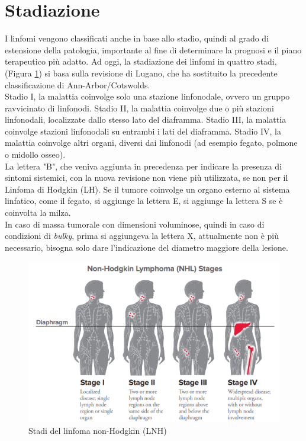 \section{Stadiazione}
I linfomi vengono classificati anche in base allo stadio, quindi al grado di estensione della patologia, 
importante al fine di determinare la prognosi e il piano terapeutico più adatto. 
Ad oggi, la stadiazione dei linfomi in quattro stadi, (Figura \ref{fig:FIGURE_2.14}) si basa sulla revisione di 
Lugano, che ha sostituito la precedente classificazione di Ann-Arbor/Cotswolds\cite{AIOM}.\\
Stadio I, la malattia coinvolge solo una stazione linfonodale, ovvero un gruppo ravvicinato di linfonodi. 
Stadio II, la malattia coinvolge due o più stazioni linfonodali, localizzate dallo stesso lato del diaframma. 
Stadio III, la malattia coinvolge stazioni linfonodali su entrambi i lati del diaframma. 
Stadio IV, la malattia coinvolge altri organi, diversi dai linfonodi (ad esempio fegato, polmone o midollo osseo)\cite{LLS}.\\
La lettera "B", che veniva aggiunta in precedenza per indicare la presenza di sintomi sistemici, 
con la nuova revisione non viene più utilizzata, se non per il Linfoma di Hodgkin (LH)\cite{AIOM}.
Se il tumore coinvolge un organo esterno al sistema linfatico, come il fegato, si aggiunge la lettera E, 
si aggiunge la lettera S se è coinvolta la milza\cite{ISTGENT}.\\
In caso di massa tumorale con dimensioni voluminose, quindi in caso di condizioni di \emph{bulky}, 
prima si aggiungeva la lettera X, attualmente non è più necessario, 
bisogna solo dare l’indicazione del diametro maggiore della lesione\cite{AIOM}.

\begin{figure}[H]
    \begin{center}
    \includegraphics[width=0.7\columnwidth]{img/nhlstages.png}
    \vspace{-3mm}
    \end{center}
    \caption{Stadi del linfoma non-Hodgkin (LNH)
    \cite{LLS}}
    \label{fig:FIGURE_2.14}
\end{figure}

